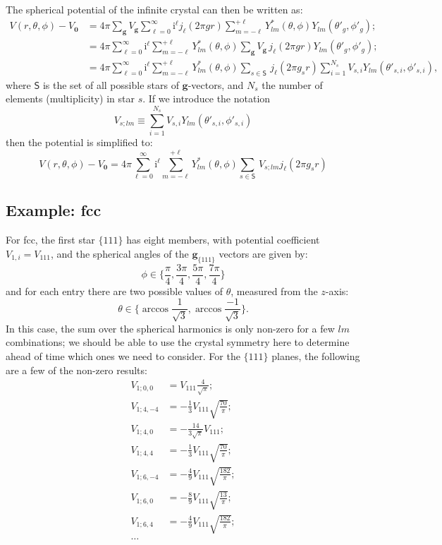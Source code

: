 \documentclass[11pt]{amsart}
\begin{document}
The spherical potential of the infinite crystal can then be written as:
\begin{align}
	V(r,\theta,\phi) - V_{\mathbf{0}} &= 
4\pi \sum_{\mathbf{g}} V_{\mathbf{g}}\sum_{\ell=0}^{\infty} \mathrm{i}^{\ell}j_{\ell}(2\pi gr)\sum_{m=-\ell}^{+\ell} Y^{\ast}_{lm}(\theta,\phi)Y_{lm}(\theta'_g,\phi'_g);\\
&= 4\pi \sum_{\ell=0}^{\infty} \mathrm{i}^{\ell} \sum_{m=-\ell}^{+\ell} Y^{\ast}_{lm}(\theta,\phi) \sum_{\mathbf{g}} V_{\mathbf{g}}\,j_{\ell}(2\pi gr)Y_{lm}(\theta'_g,\phi'_g);\\
&= 4\pi \sum_{\ell=0}^{\infty} \mathrm{i}^{\ell} \sum_{m=-\ell}^{+\ell} Y^{\ast}_{lm}(\theta,\phi) \sum_{s\in\mathsf{S}}\,j_{\ell}(2\pi g_{s}r)\sum_{i=1}^{N_s} V_{s,i}Y_{lm}(\theta'_{s,i},\phi'_{s,i}),
\end{align}
where $\mathsf{S}$ is the set of all possible stars of $\mathbf{g}$-vectors, and $N_s$ the number of elements (multiplicity) in star $s$.
If we introduce the notation 
\begin{equation}
	V_{s;lm} \equiv \sum_{i=1}^{N_s} V_{s,i}Y_{lm}(\theta'_{s,i},\phi'_{s,i})
\end{equation}
then the potential is simplified to:
\begin{equation}
	V(r,\theta,\phi) - V_{\mathbf{0}} = 
4\pi \sum_{\ell=0}^{\infty} \mathrm{i}^{\ell} \sum_{m=-\ell}^{+\ell} Y^{\ast}_{lm}(\theta,\phi) \sum_{s\in\mathsf{S}}\,V_{s;lm} j_{\ell}(2\pi g_{s}r)
\end{equation}

\subsection{Example: fcc}
For fcc, the first star $\{111\}$ has eight members, with potential coefficient $V_{1,i} = V_{111}$, and the spherical angles of the $\mathbf{g}_{\{111\}}$ vectors are 
given by:
\[ 
	\phi \in \{ \frac{\pi}{4}, \frac{3\pi}{4}, \frac{5\pi}{4}, \frac{7\pi}{4} \}
\]
and for each entry there are two possible values of $\theta$, measured from the $z$-axis:
\[
	\theta \in \{ \arccos\frac{1}{\sqrt{3}}, \arccos\frac{-1}{\sqrt{3}}  \}.
\] 
In this case, the sum over the spherical harmonics is only non-zero for a few $lm$ combinations; we should be able to use the crystal symmetry here to determine
ahead of time which ones we need to consider.  For the $\{111\}$ planes, the following are a few of the non-zero results:
\begin{align*}
	V_{1;0,0} &= V_{111}\frac{4}{\sqrt{\pi}};\\
	V_{1;4,-4} &= -\frac{1}{3}V_{111}\sqrt{\frac{70}{\pi}};\\
	V_{1;4,0} &= -\frac{14}{3\sqrt{\pi}}V_{111};\\
	V_{1;4,4} &= -\frac{1}{3}V_{111}\sqrt{\frac{70}{\pi}};\\
	V_{1;6,-4} &= -\frac{4}{9}V_{111}\sqrt{\frac{182}{\pi}};\\
	V_{1;6,0} &= -\frac{8}{9}V_{111}\sqrt{\frac{13}{\pi}};\\
	V_{1;6,4} &= -\frac{4}{9}V_{111}\sqrt{\frac{182}{\pi}};\\
	\ldots &
\end{align*}
\end{document}

